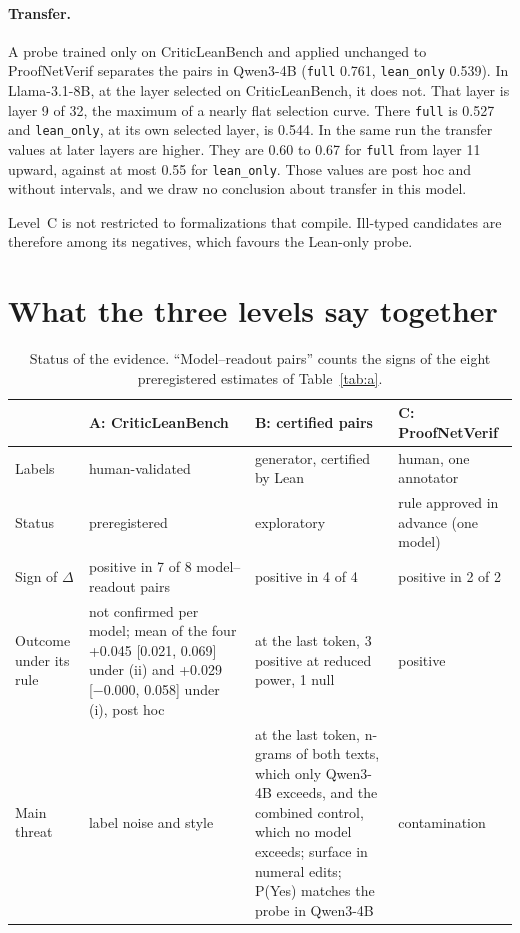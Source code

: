 \documentclass[10pt]{article}
\newcommand{\vr}[1]{\texttt{#1}}
\newcommand{\D}{\Delta}
\begin{document}
\paragraph{Transfer.}
A probe trained only on CriticLeanBench and applied unchanged to ProofNetVerif separates the pairs in Qwen3-4B
(\vr{full} 0.761, \vr{lean\_only} 0.539). In Llama-3.1-8B, at the layer selected on CriticLeanBench, it does not.
That layer is layer 9 of 32, the maximum of a nearly flat selection curve. There \vr{full} is 0.527 and
\vr{lean\_only}, at its own selected layer, is 0.544. In the same run the transfer values at later layers are
higher. They are 0.60 to 0.67 for \vr{full} from layer 11 upward, against at most 0.55 for \vr{lean\_only}. Those
values are post hoc and without intervals, and we draw no conclusion about transfer in this model.

Level~C is not restricted to formalizations that compile. Ill-typed candidates are therefore among its negatives,
which favours the Lean-only probe.

\section{What the three levels say together}

\begin{table}[h]
\centering
\caption{Status of the evidence. ``Model--readout pairs'' counts the signs of the eight preregistered estimates of Table~\ref{tab:a}.}
\label{tab:conjunta}
\vspace{2pt}
\begin{tabularx}{\linewidth}{@{}lXXX@{}}
\toprule
 & A: CriticLeanBench & B: certified pairs & C: ProofNetVerif\\
\midrule
Labels & human-validated & generator, certified by Lean & human, one annotator\\
Status & preregistered & exploratory & rule approved in advance (one model)\\
Sign of $\D$ & positive in 7 of 8 model--readout pairs & positive in 4 of 4 & positive in 2 of 2\\
Outcome under its rule & not confirmed per model; mean of the four +0.045 [0.021, 0.069] under (ii) and +0.029 [−0.000, 0.058] under (i), post hoc & at the last token, 3 positive at reduced power, 1 null & positive\\
Main threat & label noise and style & at the last token, n-grams of both texts, which only Qwen3-4B exceeds, and the combined control, which no model exceeds; surface in numeral edits; P(Yes) matches the probe in Qwen3-4B & contamination\\
\bottomrule
\end{tabularx}
\end{table}
\end{document}
